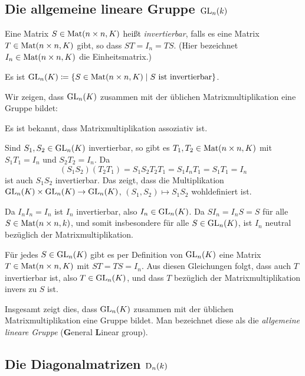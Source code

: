 \subsection{Die allgemeine lineare Gruppe \texorpdfstring{$\mathrm{GL}_n(k)$}{GLnk}}

\begin{defi}
 Eine Matrix $S \in \mathrm{Mat}(n \times n, K)$ heißt \emph{invertierbar}, falls es eine Matrix $T \in \mathrm{Mat}(n \times n, K)$ gibt, so dass $ST = I_n = TS$. (Hier bezeichnet $I_n \in \mathrm{Mat}(n \times n, K)$ die Einheitsmatrix.)
 
 Es ist $\mathrm{GL}_n(K) \coloneqq \{S \in \mathrm{Mat}(n \times n, K) \mid \text{$S$ ist invertierbar}\}$.
\end{defi}

Wir zeigen, dass $\mathrm{GL}_n(K)$ zusammen mit der üblichen Matrixmultiplikation eine Gruppe bildet:

Es ist bekannt, dass Matrixmultiplikation assoziativ ist.

Sind $S_1, S_2 \in \mathrm{GL}_n(K)$ invertierbar, so gibt es $T_1, T_2 \in \mathrm{Mat}(n \times n, K)$ mit $S_1 T_1 = I_n$ und $S_2 T_2 = I_n$. Da
\[
 (S_1 S_2) (T_2 T_1)
 = S_1 S_2 T_2 T_1
 = S_1 I_n T_1
 = S_1 T_1
 = I_n
\]
ist auch $S_1 S_2$ invertierbar. Das zeigt, dass die Multiplikation $\mathrm{GL}_n(K) \times \mathrm{GL}_n(K) \to \mathrm{GL}_n(K)$, $(S_1, S_2) \mapsto S_1 S_2$ wohldefiniert ist.

Da $I_n I_n = I_n$ ist $I_n$ invertierbar, also $I_n \in \mathrm{GL}_n(K)$. Da $S I_n = I_n S = S$ für alle $S \in \mathrm{Mat}(n \times n, k)$, und somit insbesondere für alle $S \in \mathrm{GL}_n(K)$, ist $I_n$ neutral bezüglich der Matrixmultiplikation.

Für jedes $S \in \mathrm{GL}_n(K)$ gibt es per Definition von $\mathrm{GL}_n(K)$ eine Matrix $T \in \mathrm{Mat}(n \times n, K)$ mit $ST = TS = I_n$. Aus diesen Gleichungen folgt, dass auch $T$ invertierbar ist, also $T \in \mathrm{GL}_n(K)$, und dass $T$ bezüglich der Matrixmultiplikation invers zu $S$ ist.

Insgesamt zeigt dies, dass $\mathrm{GL}_n(K)$ zusammen mit der üblichen Matrixmultiplikation eine Gruppe bildet. Man bezeichnet diese als die \emph{allgemeine lineare Gruppe} (\textbf{G}eneral \textbf{L}inear group).



\subsection{Die Diagonalmatrizen \texorpdfstring{$\mathrm{D}_n(k)$}{Dn(k)}}

